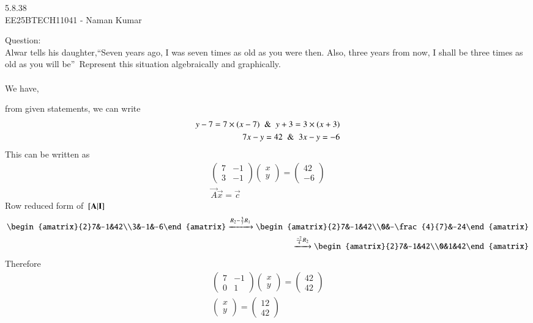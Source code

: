 \documentclass[journal]{IEEEtran}
\author{EE25BTECH11041-Naman Kumar }
\begin{document}
\begin{center}
    \huge{5.8.38}\\
    \large{EE25BTECH11041 - Naman Kumar}
\end{center}
Question:\\
Alwar tells his daughter,``Seven years ago, I was seven times as old as you were then. Also, three years from now, I shall be three times as old as you will be''\ Represent this situation algebraically and graphically.\\
\solution \\
We have,

from given statements, we can write
\begin{align}
    y-7=7\times(x-7)\And y+3=3\times(x+3)\\
    7x-y=42\And3x-y=-6
\end{align}
This can be written as
\begin{align}
\begin{pmatrix}7&-1\\3&-1\end{pmatrix}\begin{pmatrix}x\\y\end{pmatrix}=\begin{pmatrix}42\\-6\end{pmatrix}\\
\vec{A}\vec{x}=\vec{c}
\end{align}
Row reduced form of ${}\left[\mathbf{A}\vert \mathbf{I}\right]$
\begin{align}
    \begin{amatrix}{2}7&-1&42\\3&-1&-6\end{amatrix}\xrightarrow[]{R_2-\frac{3}{7}R_1}\begin{amatrix}{2}7&-1&42\\0&-\frac{4}{7}&-24\end{amatrix}\\
    \xrightarrow[]{\frac{-7}{4}R_2}\begin{amatrix}{2}7&-1&42\\0&1&42\end{amatrix}
\end{align}
Therefore
\begin{align}
    \begin{pmatrix}7&-1\\0&1\end{pmatrix}\begin{pmatrix}x\\y\end{pmatrix}=\begin{pmatrix}42\\42\end{pmatrix}\\
    \begin{pmatrix}x\\y\end{pmatrix}=\begin{pmatrix}12\\42\end{pmatrix}
\end{align}
\end{document}
